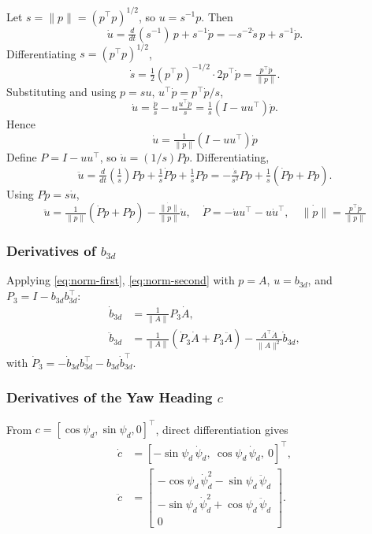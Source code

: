 \documentclass[11pt]{article}
\theoremstyle{remark}
\begin{document}
Let $s = \|p\| = (p^\top p)^{1/2}$, so $u = s^{-1}p$. Then
\[
\dot u = \tfrac{d}{dt}(s^{-1})\,p + s^{-1}\dot p = -s^{-2}\dot s\,p + s^{-1}\dot p.
\]
Differentiating $s = (p^\top p)^{1/2}$,
\[
\dot s = \tfrac{1}{2}(p^\top p)^{-1/2}\cdot 2 p^\top\dot p = \tfrac{p^\top\dot p}{\|p\|}.
\]
Substituting and using $p = su$, $u^\top\dot p = p^\top\dot p/s$,
\[
\dot u = \tfrac{\dot p}{s} - u\tfrac{u^\top\dot p}{s} = \tfrac{1}{s}(I - uu^\top)\dot p.
\]
Hence
\begin{equation}
\boxed{\quad\dot u = \tfrac{1}{\|p\|}(I - uu^\top)\dot p\quad}
\label{eq:norm-first}
\end{equation}
Define $P = I - uu^\top$, so $\dot u = (1/s)P\dot p$. Differentiating,
\[
\ddot u = \tfrac{d}{dt}\!\left(\tfrac{1}{s}\right)P\dot p + \tfrac{1}{s}\dot P\dot p + \tfrac{1}{s}P\ddot p = -\tfrac{\dot s}{s^2}P\dot p + \tfrac{1}{s}(\dot P\dot p + P\ddot p).
\]
Using $P\dot p = s\dot u$,
\begin{equation}
\boxed{\quad \ddot u = \tfrac{1}{\|p\|}(\dot P\dot p + P\ddot p) - \tfrac{\dot{\|p\|}}{\|p\|}\dot u,\quad \dot P = -\dot u u^\top - u\dot u^\top,\quad \dot{\|p\|} = \tfrac{p^\top\dot p}{\|p\|}\quad}
\label{eq:norm-second}
\end{equation}

\subsubsection{Derivatives of $b_{3d}$}
Applying \eqref{eq:norm-first}, \eqref{eq:norm-second} with $p = A$, $u = b_{3d}$, and $P_3 = I - b_{3d}b_{3d}^\top$:
\begin{align}
\dot b_{3d} &= \tfrac{1}{\|A\|}P_3\dot A,\label{eq:b3d-dot}\\
\ddot b_{3d} &= \tfrac{1}{\|A\|}(\dot P_3\dot A + P_3\ddot A) - \tfrac{A^\top\dot A}{\|A\|^2}\dot b_{3d},\label{eq:b3d-ddot}
\end{align}
with $\dot P_3 = -\dot b_{3d}b_{3d}^\top - b_{3d}\dot b_{3d}^\top$.

\subsubsection{Derivatives of the Yaw Heading $c$}
From $c = [\cos\psi_d,\sin\psi_d,0]^\top$, direct differentiation gives
\begin{align}
\dot c &= [-\sin\psi_d\,\dot\psi_d,\ \cos\psi_d\,\dot\psi_d,\ 0]^\top,\\
\ddot c &=
\begin{bmatrix}
-\cos\psi_d\,\dot\psi_d^2 - \sin\psi_d\,\ddot\psi_d\\
-\sin\psi_d\,\dot\psi_d^2 + \cos\psi_d\,\ddot\psi_d\\
0
\end{bmatrix}.
\end{align}
\end{document}
